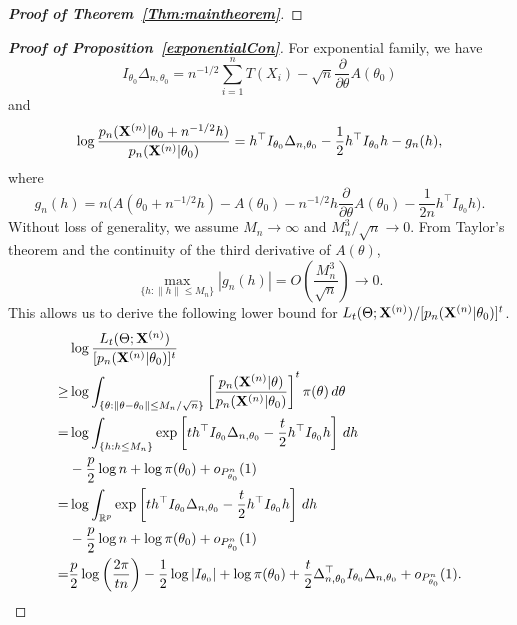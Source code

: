 \documentclass[11pt]{article}
\theoremstyle{plain}
\theoremstyle{definition}
\theoremstyle{remark}
\begin{document}
\begin{appendices}
\begin{proof}[\textbf{Proof of Theorem~\ref{Thm:maintheorem}}]
    \end{proof}

\begin{proof}[\textbf{Proof of Proposition~\ref{exponentialCon}}]
    For exponential family, we have
    $$
    I_{\theta_0}\Delta_{n,\theta_0}=n^{-1/2}\sum_{i=1}^n T(X_i)-\sqrt{n}\frac{\partial}{\partial \theta} A(\theta_0)
    $$
    and
    $$
    \log\frac{p_n(\mathbf{X}^{(n)}|\theta_0+n^{-1/2}h)}{p_n(\mathbf{X}^{(n)}|\theta_0)}
    =h^\top  I_{\theta_0} \Delta_{n,\theta_0}-\frac{1}{2} h^\top  I_{\theta_0} h-
    g_n(h),
    $$
    where
    $$
    g_n(h)=n\Big(A(\theta_0+n^{-1/2}h)-A(\theta_0)-n^{-1/2}h \frac{\partial}{\partial \theta}A(\theta_0)-\frac{1}{2n}h^\top  I_{\theta_0}h\Big).
    $$
    Without loss of generality, we assume $M_n\to \infty$ and $M_n^3/\sqrt{n}\to 0$.
    From Taylor's theorem and the continuity of the third derivative of $A(\theta)$, 
    $$
        \max_{\{h:\|h\|\leq M_n\}}|g_n(h)|=O\left(\frac{M_n^3}{\sqrt{n}}\right)\to 0.
    $$
    This allows us to derive the following lower bound for $L_t(\Theta;\mathbf{X}^{(n)})/[p_n(\mathbf{X}^{(n)}|\theta_0)]^t$.
    \begin{equation}\label{yaotou1}
    \begin{split}
&\log \frac{L_t(\Theta;\mathbf{X}^{(n)})}{[ p_n(\mathbf{X}^{(n)}|\theta_0)]^t}
    \\
    \geq &
    \log \int_{\{\theta:\|\theta-\theta_0\|\leq M_n/\sqrt{n}\}} \left[\frac{p_n(\mathbf{X}^{(n)}|\theta)}{p_n(\mathbf{X}^{(n)}|\theta_0)}\right]^t \pi(\theta)\, d\theta
    \\
    =&
    \log\int_{\{h:h\leq M_n\}} \exp\left[ t h^\top  I_{\theta_0}\Delta_{n,\theta_0}-\frac{t}{2}h^\top  I_{\theta_0}h\right] \, dh
    \\
&-\frac{p}{2}\log n+\log \pi(\theta_0)
    +o_{P_{\theta_0}^n}(1)
    \\
    =&
    \log\int_{\mathbb{R}^p} \exp\left[ t h^\top  I_{\theta_0}\Delta_{n,\theta_0}-\frac{t}{2}h^\top  I_{\theta_0}h\right] \, dh
    \\
&-\frac{p}{2}\log n+\log \pi(\theta_0)
    +o_{P_{\theta_0}^n}(1)
    \\
    =&
        \frac{p}{2}\log\left(\frac{2\pi}{t n}\right)-\frac{1}{2}\log |I_{\theta_0}|
        +\log \pi(\theta_0)
     +
    \frac{t}{2}\Delta_{n,\theta_0}^\top  I_{\theta_0}\Delta_{n,\theta_0}
    +o_{P^n_{\theta_0}}(1).
    \end{split}
\end{equation}


\end{proof}
\end{appendices}
\end{document}
